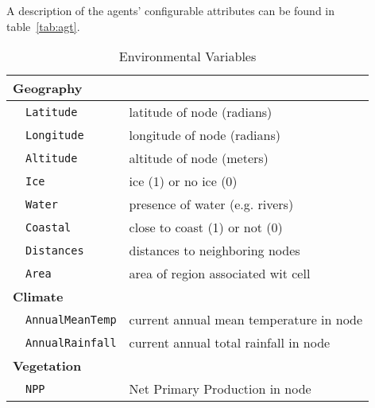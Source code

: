 \documentclass[a4paper,oneside]{article}
\begin{document}
A description of the agents' configurable attributes can be found in table~\ref{tab:agt}.


\begin{table}[ht!]
  \begin{center}
  \caption{Environmental Variables}
  \label{tab:env}
  \begin{tabular}{cl|l}
    \hline
    \multicolumn{3}{l}{\bf{Geography}}                                 \\
    \hline
    \space & \texttt{Latitude}    &  latitude of node  (radians)                \\
    \space & \texttt{Longitude}   &  longitude of node (radians)                \\ 
    \space & \texttt{Altitude}    &  altitude of node (meters)                  \\
    \space & \texttt{Ice}         &  ice (1) or no ice (0)                      \\
    \space & \texttt{Water}       &  presence of water (e.g. rivers)            \\  
    \space & \texttt{Coastal}     &  close to coast (1) or not (0)              \\ 
    \space & \texttt{Distances}   &  distances to neighboring nodes             \\
    \space & \texttt{Area}        &  area of region associated wit cell         \\
    \hline
    \multicolumn{2}{l}{\bf{Climate}}                                   \\
    \hline
    \space & \texttt{AnnualMeanTemp} &  current annual mean temperature in node \\
    \space & \texttt{AnnualRainfall} &  current annual total rainfall in node   \\
    \hline
    \multicolumn{2}{l}{\bf{Vegetation}}                                \\
    \hline
    \space & \texttt{NPP}            &  Net Primary Production in node          \\
    \hline

  \end{tabular}

  \end{center}
\end{table}
\end{document}
